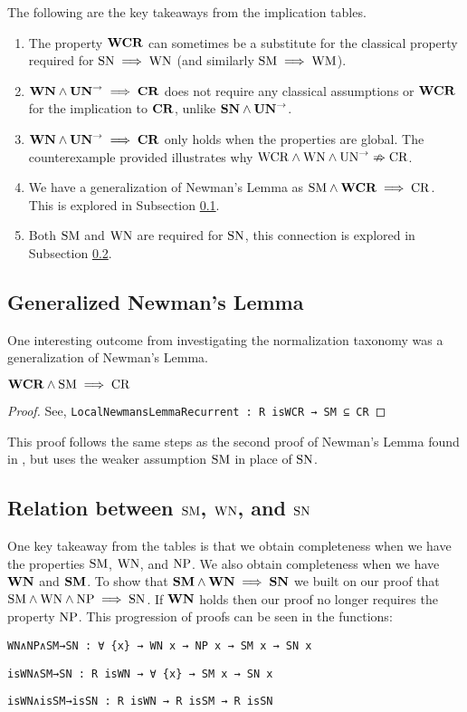 \begin{remark} The following are the key takeaways from the implication tables. \hfill
    \begin{enumerate}
        \item The property $\mathbf{WCR}$ can sometimes be a substitute for the classical 
        property required for $\mathrm{SN} \implies \mathrm{WN}$ (and similarly $\mathrm{SM} \implies \mathrm{WM}$).   
        \item $\mathbf{WN} \land \mathbf{UN}^{\to} \implies \mathbf{CR}$ does not require any classical assumptions
         or $\mathbf{WCR}$ for the implication to $\mathbf{CR}$, unlike $\mathbf{SN} \land \mathbf{UN}^{\to}$. 
        \item $\mathbf{WN} \land \mathbf{UN}^{\to} \implies \mathbf{CR}$ only holds when the properties are global. The 
        counterexample provided illustrates why $\mathrm{WCR} \land \mathrm{WN} \land \mathrm{UN}^{\to} \nRightarrow \mathrm{CR}$.
        \item We have a generalization of Newman's Lemma as $\mathrm{SM} \land \mathbf{WCR} \implies \mathrm{CR}$. This is explored in Subsection \ref{subsec:newnewman}.
        \item Both $\mathrm{SM}$ and $\mathrm{WN}$ are required for $\mathrm{SN}$, this connection is explored in Subsection \ref{subsec:SMWNSN}.
    \end{enumerate}
\end{remark}

\subsection{Generalized Newman's Lemma}\label{subsec:newnewman}
One interesting outcome from investigating the normalization taxonomy was a generalization of Newman's Lemma. 

\begin{proposition}
    $\mathbf{WCR} \land \mathrm{SM} \implies \mathrm{CR}$
\end{proposition}
\begin{proof}
    See, \verb|LocalNewmansLemmaRecurrent : R isWCR → SM ⊆ CR|
\end{proof}

This proof follows the same steps as the second proof of Newman's Lemma found in \terese, but 
uses the weaker assumption $\mathrm{SM}$ in place of $\mathrm{SN}$. 

\subsection{Relation between $\mathrm{SM}$, $\mathrm{WN}$, and $\mathrm{SN}$} \label{subsec:SMWNSN}
One key takeaway from the tables is that we obtain completeness when we have the properties $\mathrm{SM}$, $\mathrm{WN}$, and $\mathrm{NP}$. We also 
obtain completeness when we have $\mathbf{WN}$ and $\mathbf{SM}$. 
To show that $\mathbf{SM} \land \mathbf{WN} \implies \mathbf{SN}$ we built on our proof that $\mathrm{SM} \land \mathrm{WN} \land \mathrm{NP} \implies \mathrm{SN}$. If $\mathbf{WN}$ holds 
then our proof no longer requires the property $\mathrm{NP}$. This progression of proofs can be seen in the functions:

\verb|WN∧NP∧SM→SN : ∀ {x} → WN x → NP x → SM x → SN x| 

\verb|isWN∧SM→SN : R isWN → ∀ {x} → SM x → SN x|

\verb|isWN∧isSM→isSN : R isWN → R isSM → R isSN| 


